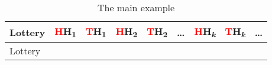 \documentclass[
  11pt,
  letterpaper,
  DIV=11,
  numbers=noendperiod,
  twoside]{scrartcl}
\begin{document}
\begin{longtable}[]{@{}
  >{\raggedleft\arraybackslash}p{}
  >{\centering\arraybackslash}p{}
  >{\centering\arraybackslash}p{}
  >{\centering\arraybackslash}p{}
  >{\centering\arraybackslash}p{}
  >{\centering\arraybackslash}p{}
  >{\centering\arraybackslash}p{}
  >{\centering\arraybackslash}p{}
  >{\centering\arraybackslash}p{}@{}}
\caption{The main example}\label{tbl-two-envelope}\tabularnewline
\toprule\noalign{}
\begin{minipage}[b]{\linewidth}\raggedleft
Lottery
\end{minipage} & \begin{minipage}[b]{\linewidth}\centering
\textcolor{red}{H}H\textsubscript{1}
\end{minipage} & \begin{minipage}[b]{\linewidth}\centering
\textcolor{red}{T}H\textsubscript{1}
\end{minipage} & \begin{minipage}[b]{\linewidth}\centering
\textcolor{red}{H}H\textsubscript{2}
\end{minipage} & \begin{minipage}[b]{\linewidth}\centering
\textcolor{red}{T}H\textsubscript{2}
\end{minipage} & \begin{minipage}[b]{\linewidth}\centering
\ldots{}
\end{minipage} & \begin{minipage}[b]{\linewidth}\centering
\textcolor{red}{H}H\textsubscript{\emph{k}}
\end{minipage} & \begin{minipage}[b]{\linewidth}\centering
\textcolor{red}{T}H\textsubscript{\emph{k}}
\end{minipage} & \begin{minipage}[b]{\linewidth}\centering
\ldots{}
\end{minipage} \\
\midrule\noalign{}
\endfirsthead
\toprule\noalign{}
\begin{minipage}[b]{\linewidth}\raggedleft
Lottery
\end{minipage} & \begin{minipage}[b]{\linewidth}\centering

\end{minipage}
\end{longtable}
\end{document}
